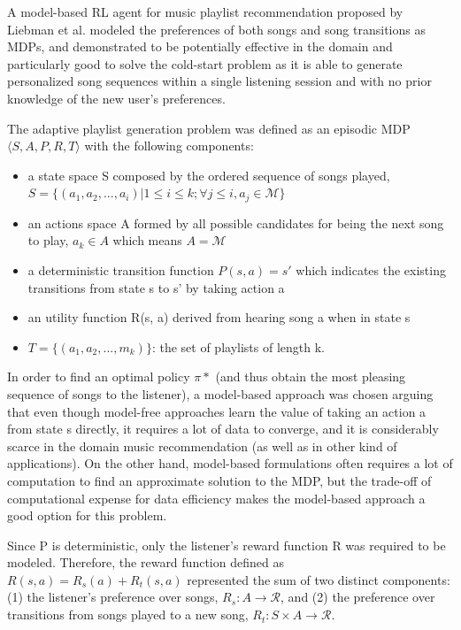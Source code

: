 A model-based RL agent for music playlist recommendation proposed by Liebman et al. \cite{liebman2015dj} modeled the preferences of both songs and song transitions as MDPs, and demonstrated to be potentially effective in the domain and particularly good to solve the cold-start problem as it is able to generate personalized song sequences within a single listening session and with no prior knowledge of the new user's preferences.

The adaptive playlist generation problem was defined as an episodic MDP $\langle S, A, P, R, T \rangle$ with the following components:
\begin{itemize}
\item a state space S composed by the ordered sequence of songs played, $S = \{(a_1, a_2, ..., a_i)|1 \leq i \leq k; \forall j \leq i, a_j \in \mathcal{M}\}$
\item an actions space A formed by all possible candidates for being the next song to play, $a_k \in A$ which means $A = \mathcal{M}$
\item a deterministic transition function $P(s, a) = s'$ which indicates the existing transitions from state s to s' by taking action a
\item an utility function R(s, a) derived from hearing song a when in state s
\item $T = \{(a_1, a_2, ..., m_k)\}$: the set of playlists of length k.
\end{itemize}

In order to find an optimal policy $\pi*$ (and thus obtain the most pleasing sequence of songs to the listener), a model-based approach was chosen arguing that even though model-free approaches learn the value of taking an action a from state s directly, it requires a lot of data to converge, and it is considerably scarce in the domain music recommendation (as well as in other kind of applications). On the other hand, model-based formulations often requires a lot of computation to find an approximate solution to the MDP, but the trade-off of computational expense for data efficiency makes the model-based approach a good option for this problem.

Since P is deterministic, only the listener's reward function R was required to be modeled. Therefore, the reward function defined as $R(s, a) = R_s(a)+R_t(s, a)$ represented the sum of two distinct components: (1) the listener's preference over songs, $R_s : A \rightarrow \mathcal{R}$, and (2) the preference over transitions from songs played to a new song, $R_t : S \times A \rightarrow \mathcal{R}$.

